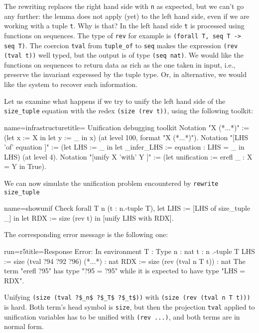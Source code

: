The rewriting replaces the right hand side with \lstinline/n/ as
expected, but we can't go any further: the lemma does not
apply (yet) to the left hand side, even if we are working
with a tuple \lstinline/t/.  Why is that?  In the left hand side
\lstinline/t/ is processed using functions on sequences.
The type of \lstinline/rev/ for example is
\lstinline/(forall T, seq T -> seq T)/.  The coercion \lstinline/tval/
from \lstinline/tuple_of/ to \lstinline/seq/ makes the
expression \lstinline/(rev (tval t))/ well typed, but the output
is of type \lstinline/(seq nat)/.
We would like the functions on sequences to return
data as rich as the one taken in input, i.e., preserve the invariant
expressed by the tuple type.  Or, in alternative, we would like the
system to recover such information.

Let us examine what happens if we try to unify the left hand side of the
\lstinline/size_tuple/ equation with the redex
\lstinline/(size (rev t))/, using the following toolkit:

\begin{coq}{name=infrastructure}{title= Unification debugging toolkit}
Notation "X (*...*)" :=
  (let x := X in let y := _ in x)   (at level 100, format "X  (*...*)").
Notation "[LHS 'of' equation ]" :=
  (let LHS := _ in
   let _infer_LHS := equation : LHS = _ in LHS)   (at level 4).
Notation "[unify X 'with' Y ]" :=
  (let unification := erefl _ : X = Y in True).
\end{coq}

We can now simulate the unification problem
encountered by \lstinline/rewrite size_tuple/

\begin{coq}{name=showunif}{}
Check forall T n (t : n.-tuple T),
 let LHS := [LHS of size_tuple _] in
 let RDX := size (rev t) in
 [unify LHS with RDX].
\end{coq}

The corresponding error message is the following one:

\begin{coqout}{run=r5}{title=Response}
Error:
In environment
T : Type
n : nat
t : n .-tuple T
LHS := size (tval ?94 ?92 ?96) (*...*) : nat
RDX := size (rev (tval n T t))           : nat
The term "erefl ?95" has type "?95 = ?95" while
it is expected to have type "LHS = RDX".
\end{coqout}

Unifying \lstinline/(size (tval ?$_n$ ?$_T$ ?$_t$))/
with \lstinline/(size (rev (tval n T t)))/ is hard.
Both term's head symbol is \lstinline/size/, but then
the projection \lstinline/tval/ applied to unification
variables has to be unified with \lstinline/(rev ...)/,
and both terms are in normal form.

